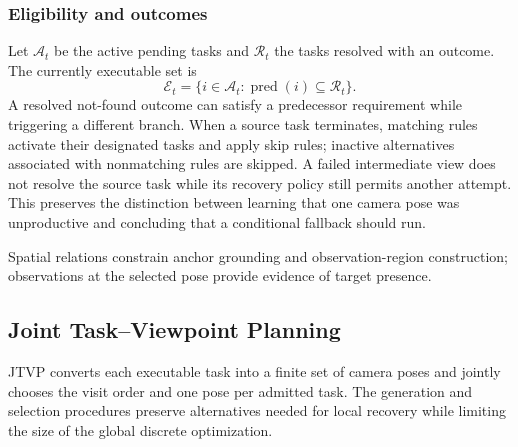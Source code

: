\documentclass[letterpaper,10pt,journal]{IEEEtran}
\begin{document}
\subsubsection{Eligibility and outcomes}
Let $\mathcal A_t$ be the active pending tasks and $\mathcal R_t$ the tasks resolved with an outcome. The currently executable set is
\begin{equation}
\mathcal E_t=\{i\in\mathcal A_t:\operatorname{pred}(i)\subseteq\mathcal R_t\}.
\label{eq:eligible}
\end{equation}
A resolved not-found outcome can satisfy a predecessor requirement while triggering a different branch. When a source task terminates, matching rules activate their designated tasks and apply skip rules; inactive alternatives associated with nonmatching rules are skipped. A failed intermediate view does not resolve the source task while its recovery policy still permits another attempt. This preserves the distinction between learning that one camera pose was unproductive and concluding that a conditional fallback should run.

Spatial relations constrain anchor grounding and observation-region construction; observations at the selected pose provide evidence of target presence.

\subsection{Joint Task--Viewpoint Planning}
\label{sec:jtvp}
JTVP converts each executable task into a finite set of camera poses and jointly chooses the visit order and one pose per admitted task. The generation and selection procedures preserve alternatives needed for local recovery while limiting the size of the global discrete optimization.
\end{document}

